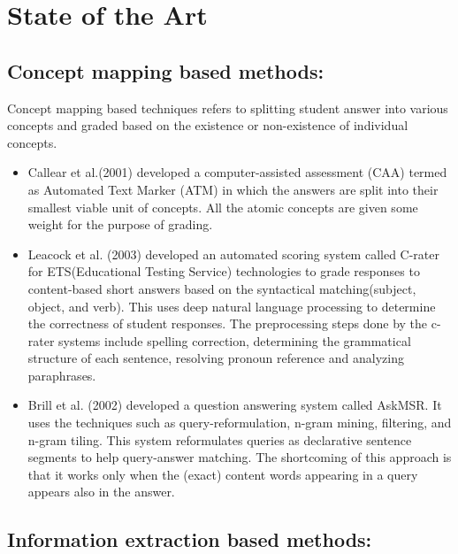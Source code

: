 
\chapter{State of the Art}

\section{Concept mapping based methods:}
Concept mapping based techniques refers to splitting student answer into various concepts and graded based on the existence or non-existence of individual concepts\cite{Burrows2015}.

\begin{itemize}
	\item Callear et al.(2001) \cite{Callear2001}	developed a  computer-assisted assessment (CAA) termed as Automated Text Marker (ATM) in which the answers are  split  into  their  smallest  viable  unit  of concepts. All the atomic concepts are given some weight for the purpose of grading.
	
	\item Leacock et al. (2003)\cite{Leacock2003} developed an automated scoring system called C-rater for ETS(Educational Testing Service) technologies to grade responses to content-based short answers based on the syntactical matching(subject, object, and verb). This uses deep natural language processing to determine the correctness of student responses. The preprocessing steps done by the c-rater systems include spelling correction, determining the grammatical structure of each sentence, resolving pronoun reference and analyzing paraphrases.
	
	\item Brill et al. (2002) \cite{Brill2002} developed a question answering system called AskMSR. It uses the techniques such as query-reformulation, n-gram mining, filtering, and n-gram tiling. This system reformulates queries as declarative sentence segments to help query-answer matching. The shortcoming of this approach is that it works only when the (exact) content words appearing in a query appears also in the answer.
	
\end{itemize}


\section{Information extraction based methods:}


